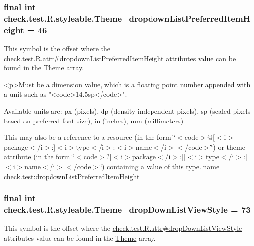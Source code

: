 \subsubsection[{Theme\+\_\+dropdown\+List\+Preferred\+Item\+Height}]{\setlength{\rightskip}{0pt plus 5cm}final int check.\+test.\+R.\+styleable.\+Theme\+\_\+dropdown\+List\+Preferred\+Item\+Height = 46\hspace{0.3cm}{\ttfamily [static]}}\label{classcheck_1_1test_1_1_r_1_1styleable_a4b8e66fe596de4f95de89a3fb97316d8}
This symbol is the offset where the \hyperlink{classcheck_1_1test_1_1_r_1_1attr_ae7b7ef58aa08b5cd48e82ced09e17dca}{check.\+test.\+R.\+attr\#dropdown\+List\+Preferred\+Item\+Height} attribute\textquotesingle{}s value can be found in the \hyperlink{classcheck_1_1test_1_1_r_1_1styleable_acca726d02016a0cf607782ec3a436a81}{Theme} array.

\begin{DoxyVerb}      <p>Must be a dimension value, which is a floating point number appended with a unit such as "<code>14.5sp</code>".
\end{DoxyVerb}
 Available units are\+: px (pixels), dp (density-\/independent pixels), sp (scaled pixels based on preferred font size), in (inches), mm (millimeters). 

This may also be a reference to a resource (in the form \char`\"{}$<$code$>$@\mbox{[}$<$i$>$package$<$/i$>$\+:\mbox{]}$<$i$>$type$<$/i$>$\+:$<$i$>$name$<$/i$>$$<$/code$>$\char`\"{}) or theme attribute (in the form \char`\"{}$<$code$>$?\mbox{[}$<$i$>$package$<$/i$>$\+:\mbox{]}\mbox{[}$<$i$>$type$<$/i$>$\+:\mbox{]}$<$i$>$name$<$/i$>$$<$/code$>$\char`\"{}) containing a value of this type.  name \hyperlink{namespacecheck_1_1test}{check.\+test}\+:dropdown\+List\+Preferred\+Item\+Height \hypertarget{classcheck_1_1test_1_1_r_1_1styleable_ab53b97b9568cde83dc65605a14dab2f4}{}
\subsubsection[{Theme\+\_\+drop\+Down\+List\+View\+Style}]{\setlength{\rightskip}{0pt plus 5cm}final int check.\+test.\+R.\+styleable.\+Theme\+\_\+drop\+Down\+List\+View\+Style = 73\hspace{0.3cm}{\ttfamily [static]}}\label{classcheck_1_1test_1_1_r_1_1styleable_ab53b97b9568cde83dc65605a14dab2f4}
This symbol is the offset where the \hyperlink{classcheck_1_1test_1_1_r_1_1attr_a2ab3d3b572318de39593854b08d4e145}{check.\+test.\+R.\+attr\#drop\+Down\+List\+View\+Style} attribute\textquotesingle{}s value can be found in the \hyperlink{classcheck_1_1test_1_1_r_1_1styleable_acca726d02016a0cf607782ec3a436a81}{Theme} array.

